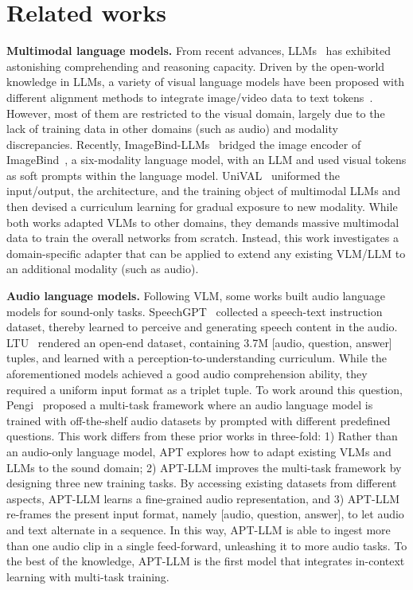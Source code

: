 \documentclass{article} %
\begin{document}
\section{Related works} \label{sec:related_works}
\textbf{Multimodal language models.}
From recent advances, LLMs~\citep{touvron_llama_2023,chiang_vicuna_2023,openai_gpt-4_2023} has exhibited astonishing comprehending and reasoning capacity. Driven by the open-world knowledge in LLMs, a variety of visual language models have been proposed with different alignment methods to integrate image/video data to text tokens~\citep{alayrac_flamingo_2022,li_blip-2_2023,dai_instructblip_2023,zhang_llama-adapter_2023}. However, most of them are restricted to the visual domain, largely due to the lack of training data in other domains (such as audio) and modality discrepancies. Recently, ImageBind-LLMs~\citep{han_imagebind-llm_2023} bridged the image encoder of ImageBind~\citep{girdhar_imagebind_2023}, a six-modality language model, with an LLM and used visual tokens as soft prompts within the language model. UniVAL~\citep{shukor_unified_2023} uniformed the input/output, the architecture, and the training object of multimodal LLMs and then devised a curriculum learning for gradual exposure to new modality. While both works adapted VLMs to other domains, they demands massive multimodal data to train the overall networks from scratch. Instead, this work investigates a domain-specific adapter that can be applied to extend any existing VLM/LLM to an additional modality (such as audio). 

\textbf{Audio language models.} Following VLM, some works built audio language models for sound-only tasks. SpeechGPT~\citep{zhang_speechgpt_2023} collected a speech-text instruction dataset, thereby learned to perceive and generating speech content in the audio. LTU~\citep{gong_listen_2023} rendered an open-end dataset, containing 3.7M [audio, question, answer] tuples, and learned with a perception-to-understanding curriculum. While the aforementioned models achieved a good audio comprehension ability, they required a uniform input format as a triplet tuple. To work around this question, Pengi~\citep{deshmukh_pengi_2023} proposed a multi-task framework where an audio language model is trained with off-the-shelf audio datasets by prompted with different predefined questions. This work differs from these prior works in three-fold: 1) Rather than an audio-only language model, APT explores how to adapt existing VLMs and LLMs to the sound domain; 2) APT-LLM improves the multi-task framework by designing three new training tasks. By accessing existing datasets from different aspects, APT-LLM learns a fine-grained audio representation, and 3) APT-LLM re-frames the present input format, namely [audio, question, answer], to let audio and text alternate in a sequence. In this way, APT-LLM is able to ingest more than one audio clip in a single feed-forward, unleashing it to more audio tasks. To the best of the knowledge, APT-LLM is the first model that integrates in-context learning with multi-task training.
\end{document}
